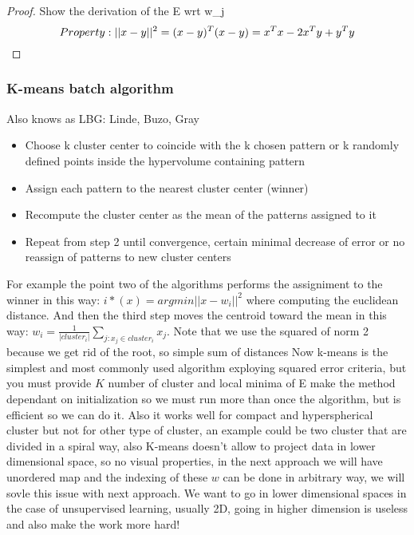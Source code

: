 \documentclass[12pt]{book}
\begin{document}
\begin{proof}
	Show the derivation of the E wrt w_j\newline\newline
	\begin{equation}
	Property: ||x - y||^2 = (x - y)^T (x - y) = x^T x - 2x^T y + y^T y \\
	\end{equation}
\end{proof}

\subsubsection{K-means batch algorithm}
Also knows as LBG: Linde, Buzo, Gray\newline
\begin{itemize}
	\item Choose k cluster center to coincide with the k chosen pattern or k randomly defined points inside the hypervolume containing pattern
	\item Assign each pattern to the nearest cluster center (winner)
	\item Recompute the cluster center as the mean of the patterns assigned to it
	\item Repeat from step 2 until convergence, certain minimal decrease of error or no reassign of patterns to new cluster centers
\end{itemize}
For example the point two of the algorithms performs the assigniment to the winner in this way: $i*(x) = arg min || x - w_i ||^2$ where computing the euclidean distance. And then the third step moves the centroid toward the mean in this way: $w_i = \frac{1}{|cluster_i|}\sum_{j: x_j \in cluster_i} x_j.$ Note that we use the squared of norm 2 because we get rid of the root, so simple sum of distances
\newline
Now k-means is the simplest and most commonly used algorithm exploying squared error criteria, but you must provide $K$ number of cluster and local minima of E make the method dependant on initialization so we must run more than once the algorithm, but is efficient so we can do it. Also it works well for compact and hyperspherical cluster but not for other type of cluster, an example could be two cluster that are divided in a spiral way, also K-means doesn't allow to project data in lower dimensional space, so no visual properties, in the next approach we will have unordered map and the indexing of these $w$ can be done in arbitrary way, we will sovle this issue with next approach. We want to go in lower dimensional spaces in the case of unsupervised learning, usually 2D, going in higher dimension is useless and also make the work more hard!\newline
\end{document}
